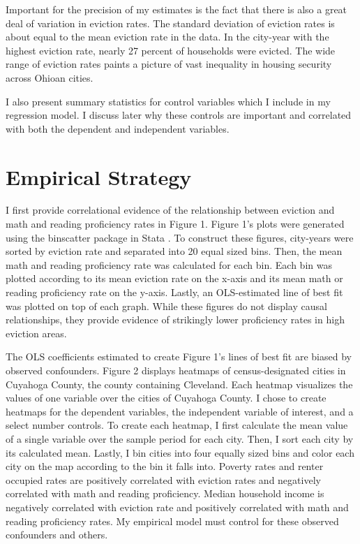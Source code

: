 \documentclass[12pt]{article}
\begin{document}
Important for the precision of my estimates is the fact that there is also a great deal of variation in eviction rates. The standard deviation of eviction rates is about equal to the mean eviction rate in the data. In the city-year with the highest eviction rate, nearly 27 percent of households were evicted. The wide range of eviction rates paints a picture of vast inequality in housing security across Ohioan cities.

I also present summary statistics for control variables which I include in my regression model. I discuss later why these controls are important and correlated with both the dependent and independent variables.



\section{Empirical Strategy} \label{sec:empirical_strategy}
I first provide correlational evidence of the relationship between eviction and math and reading proficiency rates in Figure 1. Figure 1's plots were generated using the binscatter package in Stata \citep{stepner_binscatter:_2013}. To construct these figures, city-years were sorted by eviction rate and separated into 20 equal sized bins. Then, the mean math and reading proficiency rate was calculated for each bin. Each bin was plotted according to its mean eviction rate on the x-axis and its mean math or reading proficiency rate on the y-axis. Lastly, an OLS-estimated line of best fit was plotted on top of each graph. While these figures do not display causal relationships, they provide evidence of strikingly lower proficiency rates in high eviction areas.

The OLS coefficients estimated to create Figure 1's lines of best fit are biased by observed confounders. Figure 2 displays heatmaps of census-designated cities in Cuyahoga County, the county containing Cleveland. Each heatmap visualizes the values of one variable over the cities of Cuyahoga County. I chose to create heatmaps for the dependent variables, the independent variable of interest, and a select number controls. To create each heatmap, I first calculate the mean value of a single variable over the sample period for each city. Then, I sort each city by its calculated mean. Lastly, I bin cities into four equally sized bins and color each city on the map according to the bin it falls into. Poverty rates and renter occupied rates are positively correlated with eviction rates and negatively correlated with math and reading proficiency. Median household income is negatively correlated with eviction rate and positively correlated with math and reading proficiency rates. My empirical model must control for these observed confounders and others.
\end{document}
